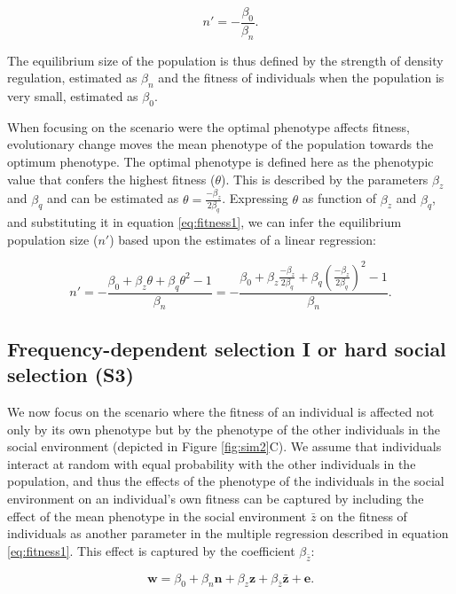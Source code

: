 \documentclass{article}
\begin{document}
\begin{equation}\label{eq:equilibrium}
n'=-\frac{\beta_{0}}{\beta_n}. 
\end{equation} 

\noindent The equilibrium size of the population is thus defined by the strength of density regulation, estimated as $\beta_n$ and the fitness of individuals when the population is very small, estimated as $\beta_0$. 

When focusing on the scenario were the optimal phenotype affects fitness, evolutionary change moves the mean phenotype of the population towards the optimum phenotype. The optimal phenotype is defined here as the phenotypic value that confers the highest fitness ($\theta$). This is described by the parameters $\beta_{z}$ and $\beta_{q}$ and can be estimated as $\theta=\frac{-\beta_{z}}{2\beta_{q}}$. Expressing $\theta$ as function of $\beta_{z}$ and $\beta_{q}$, and substituting it in equation \ref{eq:fitness1}, we can infer the equilibrium population size ($n'$) based upon the estimates of a linear regression:

\begin{equation}\label{eq:equilibrium1}
n'=-\frac{\beta_{0}+ \beta_{z}\theta + \beta_{q}\theta^2-1}{\beta_n} = -\frac{\beta_{0}+ \beta_{z}\frac{-\beta_{z}}{2\beta_{q}} + \beta_{q}(\frac{-\beta_{z}}{2\beta_{q}})^2-1}{\beta_n}. 
\end{equation}




\subsection{Frequency-dependent selection I or hard social selection (S3)}

We now focus on the scenario where the fitness of an individual is affected not only by its own phenotype but by the phenotype of the other individuals in the social environment (depicted in Figure \ref{fig:sim2}C). We assume that individuals interact at random with equal probability with the other individuals in the population, and thus the effects of the phenotype of the individuals in the social environment on an individual's own fitness can be captured by including the effect of the mean phenotype in the social environment $\bar{z}$ on the fitness of individuals as another parameter in the multiple regression described in equation \ref{eq:fitness1}. This effect is captured by the coefficient $\beta_{\bar{z}}$:  

\begin{equation} \label{eq: socialselection}
\mathbf{w}=\beta_{0} +\beta_{n} \mathbf{n} + \beta_{z} \mathbf{z}+ \beta_{\bar{z}} \bar{\mathbf{z}}+ \mathbf{e}.
\end{equation}
 
\end{document}
